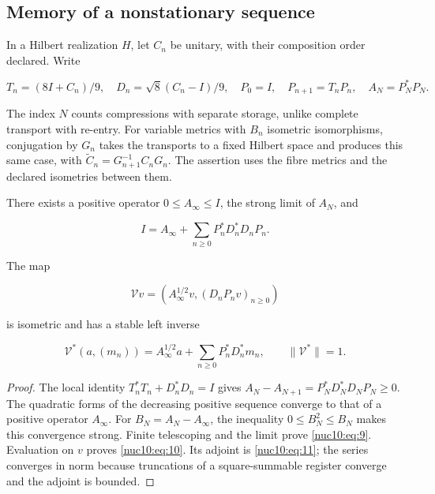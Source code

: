 \subsection{Memory of a nonstationary sequence}

In a Hilbert realization \(H\), let \(C_n\) be unitary, with their composition order declared. Write

\[
T_n=(8I+C_n)/9,\quad D_n=\sqrt8(C_n-I)/9,
\quad P_0=I,\quad P_{n+1}=T_nP_n,\quad A_N=P_N^*P_N.
\]

The index \(N\) counts compressions with separate storage, unlike complete transport with re-entry. For variable metrics with \(B_n\) isometric isomorphisms, conjugation by \(G_n\) takes the transports to a fixed Hilbert space and produces this same case, with \(\widetilde C_n=G_{n+1}^{-1}C_nG_n\). The assertion uses the fibre metrics and the declared isometries between them.

\begin{theorem}
\label{nuclear:terminal-no-estacionario}
There exists a positive operator \(0\leq A_\infty\leq I\), the strong limit of \(A_N\), and

\begin{equation}
\boxed{I=A_\infty+\sum_{n\ge0}P_n^*D_n^*D_nP_n.}
\label{nuc10:eq:9}
\end{equation}

The map

\begin{equation}
\boxed{\mathcal Vv=(A_\infty^{1/2}v,(D_nP_nv)_{n\ge0})}
\label{nuc10:eq:10}
\end{equation}

is isometric and has a stable left inverse

\begin{equation}
\mathcal V^*(a,(m_n))=A_\infty^{1/2}a+
\sum_{n\ge0}P_n^*D_n^*m_n,\qquad\|\mathcal V^*\|=1.
\label{nuc10:eq:11}
\end{equation}

\end{theorem}
\begin{proof}
The local identity \(T_n^*T_n+D_n^*D_n=I\) gives \(A_N-A_{N+1}=P_N^*D_N^*D_NP_N\geq0\). The quadratic forms of the decreasing positive sequence converge to that of a positive operator \(A_\infty\). For \(B_N=A_N-A_\infty\), the inequality \(0\leq B_N^2\leq B_N\) makes this convergence strong. Finite telescoping and the limit prove \eqref{nuc10:eq:9}. Evaluation on \(v\) proves \eqref{nuc10:eq:10}. Its adjoint is \eqref{nuc10:eq:11}; the series converges in norm because truncations of a square-summable register converge and the adjoint is bounded.
\end{proof}

